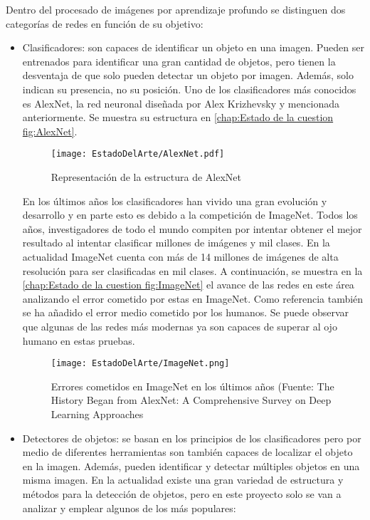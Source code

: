 Dentro del procesado de imágenes por aprendizaje profundo se distinguen dos categorías de redes en función de su objetivo:

\begin{itemize}
\item Clasificadores: son capaces de identificar un objeto en una imagen. Pueden ser entrenados para identificar una gran cantidad de objetos, pero tienen la desventaja de que solo pueden detectar un objeto por imagen. Además, solo indican su presencia, no su posición. Uno de los clasificadores más conocidos es AlexNet, la red neuronal diseñada por Alex Krizhevsky y mencionada anteriormente. Se muestra su estructura en \autoref{chap:Estado de la cuestion fig:AlexNet}.

\begin{figure}[ht]
	\centering
	\texttt{[image: EstadoDelArte/AlexNet.pdf]}
	\caption[Estructura de AlexNet]{Representación de la estructura de AlexNet \cite{AlexNet}}
	\label{chap:Estado de la cuestion fig:AlexNet}
	\vspace{-5pt}
\end{figure}

En los últimos años los clasificadores han vivido una gran evolución y desarrollo y en parte esto es debido a la competición de ImageNet. Todos los años, investigadores de todo el mundo compiten por intentar obtener el mejor resultado al intentar clasificar millones de imágenes y mil clases. En la actualidad ImageNet cuenta con más de 14 millones de imágenes de alta resolución para ser clasificadas en mil clases. A continuación, se muestra en la \autoref{chap:Estado de la cuestion fig:ImageNet} el avance de las redes en este área analizando el error cometido por estas en ImageNet. Como referencia también se ha añadido el error medio cometido por los humanos. Se puede observar que algunas de las redes más modernas ya son capaces de superar al ojo humano en estas pruebas.

\begin{figure}[ht]
	\centering
	\texttt{[image: EstadoDelArte/ImageNet.png]}
	\caption[Errores cometidos en ImageNet en los últimos años]{Errores cometidos en ImageNet en los últimos años (Fuente: The History Began from AlexNet: A Comprehensive Survey on Deep Learning Approaches \cite{alom2018history}}
	\label{chap:Estado de la cuestion fig:ImageNet}
	\vspace{-5pt}
\end{figure}


\item Detectores de objetos: se basan en los principios de los clasificadores pero por medio de diferentes herramientas son también capaces de localizar el objeto en la imagen. Además, pueden identificar y detectar múltiples objetos en una misma imagen. En la actualidad existe una gran variedad de estructura y métodos para la detección de objetos, pero en este proyecto solo se van a analizar y emplear algunos de los más populares:


\end{itemize}
